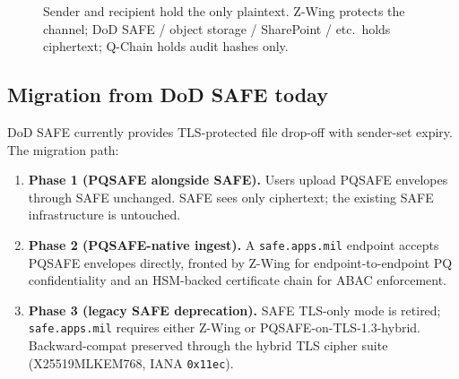 \documentclass[11pt,a4paper]{article}
\begin{document}
\begin{figure}[H]
\centering
{}
\caption{Sender and recipient hold the only plaintext. Z-Wing protects
the channel; DoD SAFE / object storage / SharePoint / etc.\ holds
ciphertext; Q-Chain holds audit hashes only.}
\end{figure}

\subsection{Migration from DoD SAFE today}

DoD SAFE currently provides TLS-protected file drop-off with sender-set
expiry. The migration path:

\begin{enumerate}[leftmargin=*,itemsep=0pt]
\item \textbf{Phase 1 (PQSAFE alongside SAFE).} Users upload PQSAFE
  envelopes through SAFE unchanged. SAFE sees only ciphertext; the
  existing SAFE infrastructure is untouched.
\item \textbf{Phase 2 (PQSAFE-native ingest).} A \texttt{safe.apps.mil}
  endpoint accepts PQSAFE envelopes directly, fronted by Z-Wing for
  endpoint-to-endpoint PQ confidentiality and an HSM-backed
  certificate chain for ABAC enforcement.
\item \textbf{Phase 3 (legacy SAFE deprecation).} SAFE TLS-only mode is
  retired; \texttt{safe.apps.mil} requires either Z-Wing or
  PQSAFE-on-TLS-1.3-hybrid. Backward-compat preserved through the
  hybrid TLS cipher suite (X25519MLKEM768, IANA \texttt{0x11ec}).
\end{enumerate}
\end{document}
